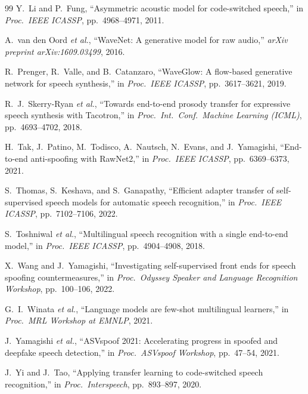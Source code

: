 \documentclass[10pt,twocolumn]{article}
\begin{document}
\begin{thebibliography}{99}
Y.~Li and P.~Fung,
``Asymmetric acoustic model for code-switched speech,''
in \emph{Proc.\ IEEE ICASSP}, pp.~4968--4971, 2011.

A.~van den Oord \emph{et al.},
``WaveNet: A generative model for raw audio,''
\emph{arXiv preprint arXiv:1609.03499}, 2016.

R.~Prenger, R.~Valle, and B.~Catanzaro,
``WaveGlow: A flow-based generative network for speech synthesis,''
in \emph{Proc.\ IEEE ICASSP}, pp.~3617--3621, 2019.

R.~J.~Skerry-Ryan \emph{et al.},
``Towards end-to-end prosody transfer for expressive speech synthesis with Tacotron,''
in \emph{Proc.\ Int.\ Conf.\ Machine Learning (ICML)}, pp.~4693--4702, 2018.

H.~Tak, J.~Patino, M.~Todisco, A.~Nautsch, N.~Evans, and J.~Yamagishi,
``End-to-end anti-spoofing with RawNet2,''
in \emph{Proc.\ IEEE ICASSP}, pp.~6369--6373, 2021.

S.~Thomas, S.~Keshava, and S.~Ganapathy,
``Efficient adapter transfer of self-supervised speech models for automatic speech recognition,''
in \emph{Proc.\ IEEE ICASSP}, pp.~7102--7106, 2022.

S.~Toshniwal \emph{et al.},
``Multilingual speech recognition with a single end-to-end model,''
in \emph{Proc.\ IEEE ICASSP}, pp.~4904--4908, 2018.

X.~Wang and J.~Yamagishi,
``Investigating self-supervised front ends for speech spoofing countermeasures,''
in \emph{Proc.\ Odyssey Speaker and Language Recognition Workshop}, pp.~100--106, 2022.

G.~I.~Winata \emph{et al.},
``Language models are few-shot multilingual learners,''
in \emph{Proc.\ MRL Workshop at EMNLP}, 2021.

J.~Yamagishi \emph{et al.},
``ASVspoof 2021: Accelerating progress in spoofed and deepfake speech detection,''
in \emph{Proc.\ ASVspoof Workshop}, pp.~47--54, 2021.

J.~Yi and J.~Tao,
``Applying transfer learning to code-switched speech recognition,''
in \emph{Proc.\ Interspeech}, pp.~893--897, 2020.

\end{thebibliography}

\end{document}
